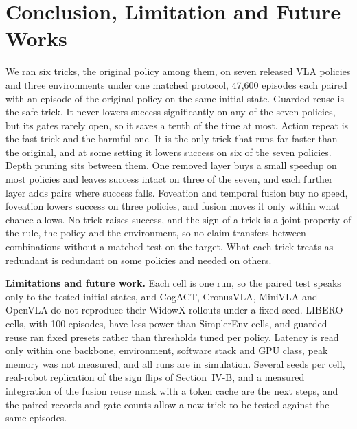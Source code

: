
\section{Conclusion, Limitation and Future Works}

We ran six tricks, the original policy among them, on seven released VLA
policies and three environments under one matched protocol, 47,600
episodes each paired with an episode of the original policy on the same
initial state. Guarded reuse is
the safe trick. It never lowers success significantly on any of the seven
policies, but its gates rarely open, so it saves a tenth of the time at
most.
Action repeat is the fast trick and the harmful one. It is the only trick
that runs far faster than the original, and at some setting it lowers
success on six of the seven policies. Depth pruning sits between them. One removed layer buys
a small speedup on most policies and leaves success intact on three of
the seven, and each further layer adds pairs where success falls. Foveation and temporal
fusion buy no speed, foveation lowers success on three policies, and
fusion moves it only within what chance allows. No trick raises success,
and the sign of
a trick is a joint property of the rule, the policy and the environment,
so no claim transfers between combinations without a matched test on
the target. What each trick treats as redundant is
redundant on some policies and needed on others.

\textbf{Limitations and future work.} Each cell is one run, so the paired
test speaks only to the tested initial states, and CogACT, CronusVLA, MiniVLA and OpenVLA do not
reproduce their WidowX rollouts under a fixed seed. LIBERO cells, with 100 episodes, have less power than SimplerEnv
cells, and guarded reuse ran fixed presets rather than thresholds tuned
per policy. Latency is read only within one backbone, environment, software stack
and GPU class, peak memory was not measured, and all runs are in
simulation. Several seeds per cell, real-robot replication of the sign
flips of Section~IV-B, and a measured integration of the fusion reuse mask
with a token cache are the next steps, and the paired records and gate
counts allow a new trick to be tested against the same
episodes.
